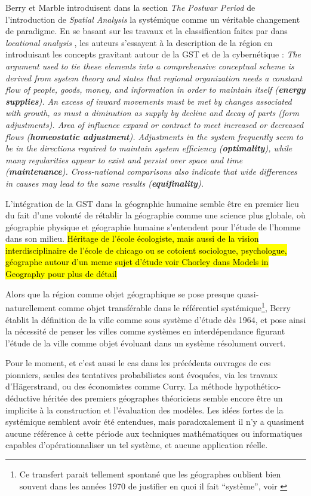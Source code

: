 Berry et Marble introduisent dans la section \textit{The Postwar Period} de l'introduction de \textit{Spatial Analysis} la systémique comme un véritable changement de paradigme. En se basant sur les travaux et la classification faites par \textcite{Haggett1965} dans \textit{locational analysis} , les auteurs s'essayent à la description de la région en introduisant les concepts gravitant autour de la GST et de la cybernétique : \textit{The argument used to tie these elements into a comprehensive conceptual scheme is derived from system theory and states that regional organization needs a constant flow of people, goods, money, and information in order to maintain itself (\textbf{energy supplies}). An excess of inward movements must be met by changes associated with growth, as must a diminution as supply by decline and decay of parts (form adjustments). Area of influence expand or contract to meet increased or decreased flows (\textbf{homeostatic adjustment}). Adjustments in the system frequently seem to be in the directions required to maintain system efficiency (\textbf{optimality}), while many regularities appear to exist and persist over space and time (\textbf{maintenance}). Cross-national comparisons also indicate that wide differences in causes may lead to the same results (\textbf{equifinality}).}

L'intégration de la GST dans la géographie humaine semble être en premier lieu du fait d'une volonté de rétablir la géographie comme une science plus globale, où géographie physique et géographie humaine s'entendent pour l'étude de l'homme dans son milieu. \hl{Héritage de l'école écologiste, mais aussi de la vision interdisciplinaire de l'école de chicago ou se cotoient sociologue, psychologue, géographe autour d'un meme sujet d'étude voir Chorley dans Models in Geography pour plus de détail}

Alors que la région comme objet géographique se pose presque quasi-naturellement comme objet transférable dans le référentiel systémique\footnote{Ce transfert parait tellement spontané que les géographes oublient bien souvent dans les années 1970 de justifier en quoi il fait \enquote{système}, voir \autocite{Orain2001}}, Berry établit la définition de la ville comme sous système d'étude dès 1964, et pose ainsi la nécessité de penser les villes comme systèmes en interdépendance figurant l'étude de la ville comme objet évoluant dans un système résolument ouvert. 

Pour le moment, et c'est aussi le cas dans les précédents ouvrages de ces pionniers, seules des tentatives probabilistes sont évoquées, via les travaux d'Hägerstrand, ou des économistes comme Curry. La méthode hypothético-déductive héritée des premiers géographes théoriciens semble encore être un implicite à la construction et l'évaluation des modèles. Les idées fortes de la systémique semblent avoir été entendues, mais paradoxalement il n'y a quasiment aucune référence à cette période aux techniques mathématiques ou informatiques capables d’opérationnaliser un tel système, et aucune application réelle. \autocite[467-468]{Harvey1969}

